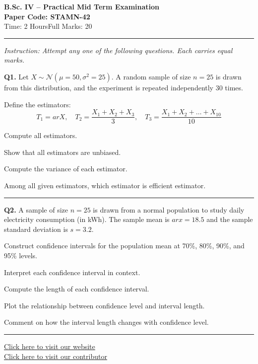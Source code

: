 \documentclass[11pt,a4paper]{article}
\begin{document}
\begin{center}
  {\large\bfseries B.Sc. IV -- Practical Mid Term Examination}\\[4pt]
  {\large\bfseries Paper Code: STAMN-42}\\[4pt]
  {\normalsize Time: 2 Hours\hfill Full Marks: 20}
\end{center}

\rule{\linewidth}{0.4pt}\smallskip



\noindent   \textit{Instruction: Attempt any one of the following questions. Each carries equal marks.}
\bigskip




\noindent   \textbf{Q1.} Let $X \sim \mathcal{N}(\mu = 50, \sigma^2 = 25)$. A random sample of size $n = 25$ is drawn from this distribution, and the experiment is repeated independently 30 times.

Define the estimators:
\[
T_1 = ar{X}, \quad T_2 = \frac{X_1 + X_2 + X_3}{3}, \quad T_3 = \frac{X_1 + X_2 + \dots + X_{10}}{10}
\]


\begin{parts}
  \item Compute all estimators.
  \item Show that all estimators are unbiased.
  \item Compute the variance of each estimator.
  \item Among all given estimators, which estimator is efficient estimator.
\end{parts}

\medskip\rule{\linewidth}{0.2pt}\medskip




\noindent   \textbf{Q2.} A sample of size $n = 25$ is drawn from a normal population to study daily electricity consumption (in kWh). The sample mean is $ar{x} = 18.5$ and the sample standard deviation is $s = 3.2$.


\begin{parts}
  \item Construct confidence intervals for the population mean at 70\%, 80\%, 90\%, and 95\% levels.
  \item Interpret each confidence interval in context.
  \item Compute the length of each confidence interval.
  \item Plot the relationship between confidence level and interval length.
  \item Comment on how the interval length changes with confidence level.
\end{parts}

\vfill
\rule{\linewidth}{0.4pt}

\begin{center}\small
\href{https://bhu-exam.vercel.app/}{Click here to visit our website}\\[4pt]
\href{https://me-aryan.vercel.app/}{Click here to visit our contributor}
\end{center}
\end{document}
